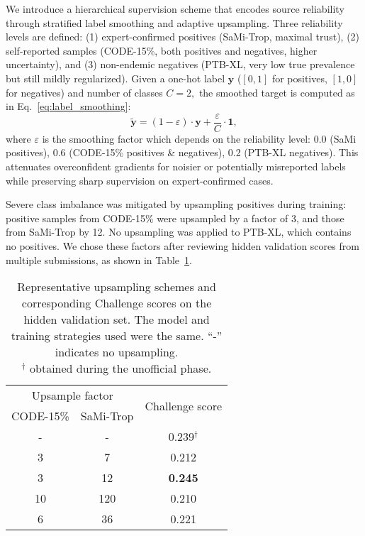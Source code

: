 \documentclass[twocolumn]{cinc}
\begin{document}
We introduce a hierarchical supervision scheme that encodes source reliability through stratified label smoothing and adaptive upsampling. Three reliability levels are defined: (1) expert-confirmed positives (SaMi-Trop, maximal trust), (2) self-reported samples (CODE-15\%, both positives and negatives, higher uncertainty), and (3) non-endemic negatives (PTB-XL, very low true prevalence but still mildly regularized). Given a one-hot label $\mathbf{y}$ ($[0, 1]$ for positives, $[1, 0]$ for negatives) and number of classes $C = 2,$ the smoothed target is computed as in Eq.~\ref{eq:label_smoothing}:
\begin{equation}
\label{eq:label_smoothing}
\tilde{\mathbf{y}} = (1 - \varepsilon) \cdot {\mathbf{y}} + \frac{\varepsilon}{C} \cdot {\mathbf{1}},
\end{equation}
where $\varepsilon$ is the smoothing factor which depends on the reliability level: 0.0 (SaMi positives), 0.6 (CODE-15\% positives \& negatives), 0.2 (PTB-XL negatives). This attenuates overconfident gradients for noisier or potentially misreported labels while preserving sharp supervision on expert-confirmed cases.

Severe class imbalance was mitigated by upsampling positives during training: positive samples from CODE-15\% were upsampled by a factor of 3, and those from SaMi-Trop by 12. No upsampling was applied to PTB-XL, which contains no positives. We chose these factors after reviewing hidden validation scores from multiple submissions, as shown in Table~\ref{tab:upsampling_schemes}.
\begin{table}[!htbp]
\centering
\begin{tabular}{ccc}
\toprule
\multicolumn{2}{c}{Upsample factor} & \multirow{2}{*}{Challenge score} \\ \cmidrule(lr){1-2}
CODE-15\% & SaMi-Trop               &                                  \\ \midrule
-         & -                       & 0.239$^\dagger$                        \\
3         & 7                       & 0.212                            \\
3         & 12                      & \textbf{0.245}                   \\
10        & 120                     & 0.210                            \\
6         & 36                      & 0.221                            \\
\bottomrule
\end{tabular}

\caption{Representative upsampling schemes and corresponding Challenge scores on the hidden validation set. The model and training strategies used were the same. “-” indicates no upsampling.\\
$^\dagger$ obtained during the unofficial phase.
}
\label{tab:upsampling_schemes}
\end{table}
\end{document}
